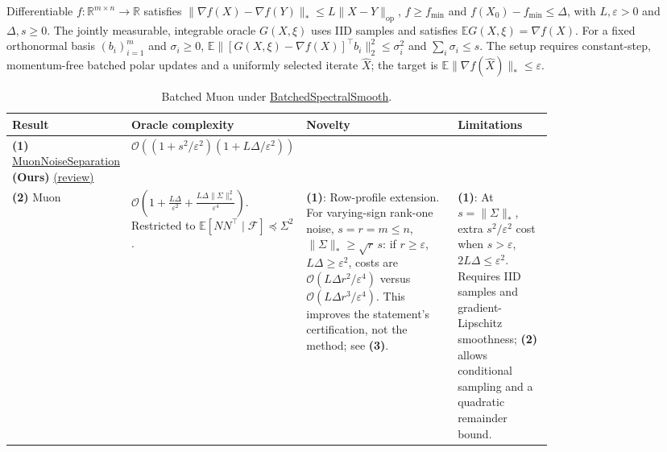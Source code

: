 \begin{table}[tp]
\centering
\caption{Batched Muon under \href{https://github.com/k3nfalt/longtails/blob/main/LongTails/Setups/BatchedSpectralSmooth.lean}{BatchedSpectralSmooth}.}\label{tab:BatchedSpectralSmooth}
\parbox{\linewidth}{\footnotesize Differentiable $f:\mathbb{R}^{m\times n}\to\mathbb{R}$ satisfies $\|\nabla f(X)-\nabla f(Y)\|_*\le L\|X-Y\|_{\mathrm{op}}$, $f\ge f_{\min}$ and $f(X_0)-f_{\min}\le\Delta$, with $L,\varepsilon>0$ and $\Delta,s\ge0$. The jointly measurable, integrable oracle $G(X,\xi)$ uses IID samples and satisfies $\mathbb{E}G(X,\xi)=\nabla f(X)$. For a fixed orthonormal basis $(b_i)_{i=1}^m$ and $\sigma_i\ge0$, $\mathbb{E}\|[G(X,\xi)-\nabla f(X)]^\top b_i\|_2^2\le\sigma_i^2$ and $\sum_i\sigma_i\le s$. The setup requires constant-step, momentum-free batched polar updates and a uniformly selected iterate $\widehat X$; the target is $\mathbb{E}\|\nabla f(\widehat X)\|_*\le\varepsilon$.}\par\smallskip
\begin{threeparttable}
\footnotesize
\setlength{\tabcolsep}{4pt}\renewcommand{\arraystretch}{1.25}
\begin{tabularx}{\linewidth}{@{}>{\raggedright\arraybackslash}p{0.20\linewidth}>{\raggedright\arraybackslash}p{0.30\linewidth}>{\raggedright\arraybackslash}p{0.28\linewidth}>{\raggedright\arraybackslash}X@{}}
\toprule
\textbf{Result} & \textbf{Oracle complexity} & \textbf{Novelty} & \textbf{Limitations} \\
\midrule
\textbf{(1)} \href{https://github.com/k3nfalt/longtails/blob/main/LongTails/Theorems/MuonNoiseSeparation.lean}{Muon\allowbreak Noise\allowbreak Separation} \textbf{(Ours)} \href{https://github.com/k3nfalt/longtails/blob/main/scripts/reviews/MuonNoiseSeparation.md}{(review)}
& $\mathcal{O}\!\left((1+s^2/\varepsilon^2)(1+L\Delta/\varepsilon^2)\right)$ & & \\
\midrule[1.2pt]
\textbf{(2)} Muon \citep[Theorem 4, v1]{bssTaoYuZhang2026v1}
& $\mathcal{O}\!\left(1+\frac{L\Delta}{\varepsilon^2}+\frac{L\Delta\|\Sigma\|_*^2}{\varepsilon^4}\right)$.
Restricted to $\mathbb{E}[NN^\top\mid\mathcal F]\preceq\Sigma^2$.
& \textbf{(1)}: Row-profile extension. For varying-sign rank-one noise, $s=r=m\le n$, $\|\Sigma\|_*\ge\sqrt r\,s$: if $r\ge\varepsilon$, $L\Delta\ge\varepsilon^2$, costs are $\mathcal{O}(L\Delta r^2/\varepsilon^4)$ versus $\mathcal{O}(L\Delta r^3/\varepsilon^4)$. This improves the statement's certification, not the method; see \textbf{(3)}.
& \textbf{(1)}: At $s=\|\Sigma\|_*$, extra $s^2/\varepsilon^2$ cost when $s>\varepsilon$, $2L\Delta\le\varepsilon^2$. Requires IID samples and gradient-Lipschitz smoothness; \textbf{(2)} allows conditional sampling and a quadratic remainder bound. \\

\end{tabularx}
\end{threeparttable}
\end{table}
